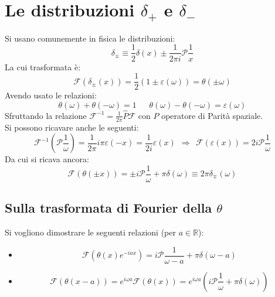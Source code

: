 \documentclass[twoside]{article}
\begin{document}
\newpage
\section{Le distribuzioni \texorpdfstring{$\delta_+$}{Lg} e \texorpdfstring{$\delta_-$}{Lg}}

Si usano comunemente in fisica le distribuzioni:
\begin{equation}
    \delta_{\pm}\equiv \frac{1}{2}\delta(x) \pm \frac{1}{2\pi i}\mathcal{P}\frac{1}{x}
\end{equation}
La cui trasformata è:
\begin{equation}
    \mathcal{F}(\delta_{\pm}(x))=\frac{1}{2}(1\pm \varepsilon(\omega))=\theta(\pm \omega)
\end{equation}
Avendo usato le relazioni:
\begin{equation}
    \theta(\omega)+\theta(-\omega)=1 \ \ \ \ \ \ \ \theta(\omega)-\theta(-\omega)=\varepsilon(\omega)
\end{equation}
Sfruttando la relazione $\mathcal{F}^{-1}=\frac{1}{2\pi}\hat{P}\mathcal{F}$ con $\hat{P}$ operatore di Parità spaziale.\\
Si possono ricavare anche le seguenti:
\begin{equation}
    \mathcal{F}^{-1}\left( \mathcal{P}\frac{1}{\omega} \right)=\frac{1}{2\pi}i \pi \varepsilon(-x)=\frac{1}{2i}\varepsilon(x) \ \ \Rightarrow \ \ \mathcal{F}(\varepsilon(x))=2i \mathcal{P}\frac{1}{\omega}
\end{equation}
Da cui si ricava ancora:
\begin{equation}
    \mathcal{F}(\theta(\pm x))=\pm i \mathcal{P}\frac{1}{\omega}+\pi \delta (\omega)\equiv 2\pi \delta_{\mp} (\omega)
\end{equation}

\subsection{Sulla trasformata di Fourier della \texorpdfstring{$\theta$}{Lg}}

Si vogliono dimostrare le seguenti relazioni (per $a \in \mathds{R}$):
\begin{itemize}
    \item 
    \begin{equation}
    \mathcal{F}(\theta(x)e^{-iax})=i\mathcal{P}\frac{1}{\omega -a}+\pi \delta (\omega -a)
    \end{equation}
    \item
    \begin{equation}
        \mathcal{F}(\theta(x-a))=e^{i\omega a}\mathcal{F}(\theta(x))=e^{i\omega a}\left( i\mathcal{P}\frac{1}{\omega}+\pi \delta(\omega) \right)
    \end{equation}
\end{itemize}
\end{document}

